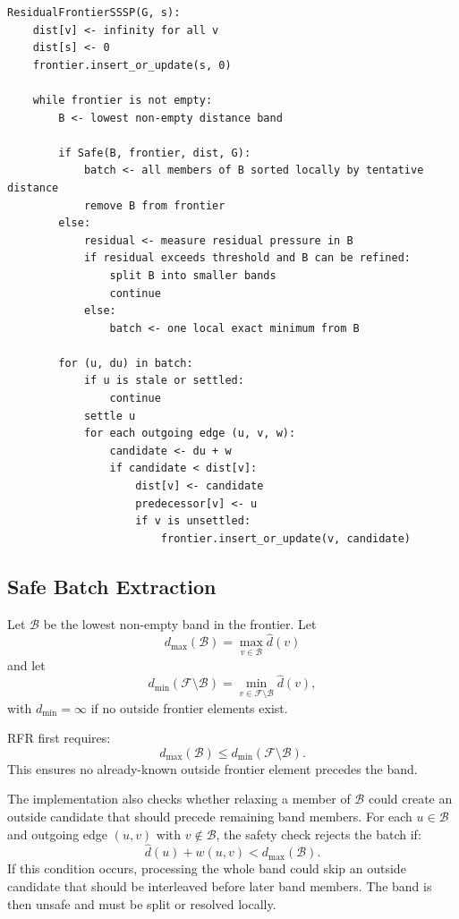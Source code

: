 \documentclass[11pt]{article}
\newcommand{\RFR}{\textsc{RFR}}
\newcommand{\frontier}{\mathcal{F}}
\newcommand{\band}{\mathcal{B}}
\begin{document}
\begin{verbatim}
ResidualFrontierSSSP(G, s):
    dist[v] <- infinity for all v
    dist[s] <- 0
    frontier.insert_or_update(s, 0)

    while frontier is not empty:
        B <- lowest non-empty distance band

        if Safe(B, frontier, dist, G):
            batch <- all members of B sorted locally by tentative distance
            remove B from frontier
        else:
            residual <- measure residual pressure in B
            if residual exceeds threshold and B can be refined:
                split B into smaller bands
                continue
            else:
                batch <- one local exact minimum from B

        for (u, du) in batch:
            if u is stale or settled:
                continue
            settle u
            for each outgoing edge (u, v, w):
                candidate <- du + w
                if candidate < dist[v]:
                    dist[v] <- candidate
                    predecessor[v] <- u
                    if v is unsettled:
                        frontier.insert_or_update(v, candidate)
\end{verbatim}

\subsection{Safe Batch Extraction}
\label{sec:safety}

Let $\band$ be the lowest non-empty band in the frontier. Let
\[
  d_{\max}(\band)=\max_{v\in \band} \hat d(v)
\]
and let
\[
  d_{\min}(\frontier\setminus \band)=\min_{v\in \frontier\setminus \band} \hat d(v),
\]
with $d_{\min}=\infty$ if no outside frontier elements exist.

\RFR{} first requires:
\[
  d_{\max}(\band) \le d_{\min}(\frontier\setminus \band).
\]
This ensures no already-known outside frontier element precedes the band.

The implementation also checks whether relaxing a member of $\band$ could create an outside candidate that should precede remaining band members. For each $u\in\band$ and outgoing edge $(u,v)$ with $v\notin\band$, the safety check rejects the batch if:
\[
  \hat d(u)+w(u,v) < d_{\max}(\band).
\]
If this condition occurs, processing the whole band could skip an outside candidate that should be interleaved before later band members. The band is then unsafe and must be split or resolved locally.
\end{document}

